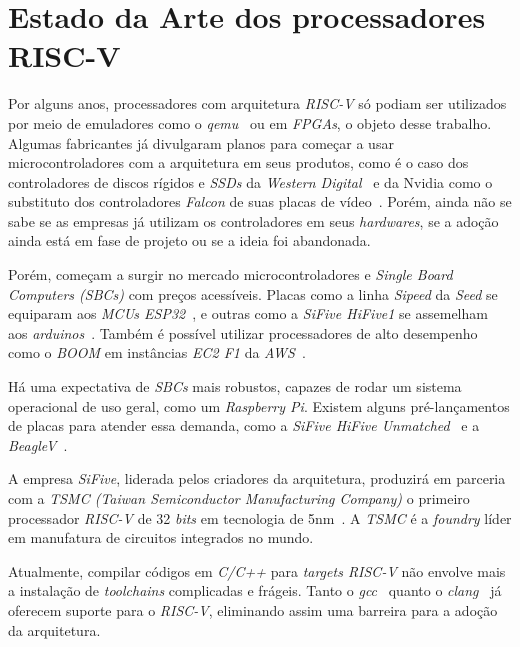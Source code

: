 \section{Estado da Arte dos processadores RISC-V}
{ Por alguns anos, processadores com arquitetura \textit{RISC-V} só podiam
    ser utilizados por meio de emuladores como o \textit{qemu}~\cite{qemu_riscv}
    ou em \textit{FPGAs}, o objeto desse trabalho. Algumas fabricantes já
    divulgaram planos para começar a usar microcontroladores com a arquitetura
    em seus produtos, como é o caso dos controladores de discos rígidos e
    \textit{SSDs} da \textit{Western Digital}~\cite{western_riscv} e da Nvidia
    como o substituto dos controladores \textit{Falcon} de suas placas de
    vídeo~\cite{nvidia_riscv}.  Porém, ainda não se sabe se as empresas já
    utilizam os controladores em seus \textit{hardwares}, se a adoção ainda
    está em fase de projeto ou se a ideia foi abandonada.
}

{ Porém, começam a surgir no mercado microcontroladores e \textit{Single
    Board Computers (SBCs)} com preços acessíveis. Placas como a linha
    \textit{Sipeed} da \textit{Seed} se equiparam aos \textit{MCUs
    ESP32}~\cite{hackaday_sipeed}, e outras como a \textit{SiFive HiFive1}
    se assemelham aos \textit{arduinos}~\cite{hifive_arduino}.
    Também é possível utilizar processadores de alto desempenho como o
    \textit{BOOM} em instâncias \textit{EC2 F1} da \textit{AWS}~\cite{boom_aws}.
}

{ Há uma expectativa de \textit{SBCs} mais robustos, capazes de rodar um
    sistema operacional de uso geral, como um \textit{Raspberry Pi}. Existem
    alguns pré-lançamentos de placas para atender essa demanda, como a
    \textit{SiFive HiFive Unmatched}~\cite{hifive_unmatched} e a
    \textit{BeagleV}~\cite{beaglev}.
}

{ A empresa \textit{SiFive}, liderada pelos criadores da arquitetura, produzirá
    em parceria com a \textit{TSMC (Taiwan Semiconductor Manufacturing Company)}
    o primeiro processador \textit{RISC-V} de 32 \textit{bits} em tecnologia
    de 5nm~\cite{sifive_tsmc}. A \textit{TSMC} é a \textit{foundry} líder em
    manufatura de circuitos integrados no mundo.
}

{ Atualmente, compilar códigos em \textit{C/C++} para \textit{targets RISC-V}
    não envolve mais a instalação de \textit{toolchains} complicadas e frágeis.
    Tanto o \textit{gcc}~\cite{gcc_riscv} quanto o \textit{clang}~\cite{clang_riscv}
    já oferecem suporte para o \textit{RISC-V}, eliminando assim uma barreira
    para a adoção da arquitetura.
}


